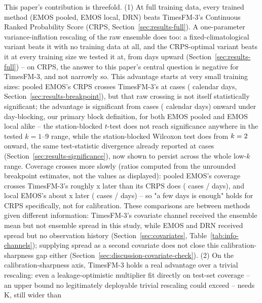This paper's contribution is threefold. (1) At full training data, every
trained method (EMOS pooled, EMOS local, DRN) beats TimesFM-3's
Continuous Ranked Probability Score (CRPS, Section~\ref{sec:results-full}).
A one-parameter variance-inflation
rescaling of the raw ensemble does too: a fixed-climatological variant
beats it with no training data at all, and the CRPS-optimal variant beats
it at every training size we tested it at, from \InflASmallestNDays{}
days upward (Section~\ref{sec:results-full}) -- on CRPS, the answer to
this paper's central question is negative for TimesFM-3, and not
narrowly so. This advantage starts at very small training sizes: pooled
EMOS's CRPS crosses TimesFM-3's at \BpCrpsPooledCases{} cases
(\BpCrpsPooledDays{} calendar days, Section~\ref{sec:results-breakpoint}),
but that raw crossing is not itself statistically significant; the
advantage is significant from \BpCrpsPooledSigK{} cases
(\BpCrpsPooledSigDays{} calendar days) onward under day-blocking, our
primary block definition, for both EMOS pooled and EMOS local alike --
the station-blocked \(t\)-test does not reach significance anywhere in
the tested \(k=1\)--9 range, while the station-blocked Wilcoxon test does
from \(k=2{}\) onward, the same
test-statistic divergence already reported at \SigTestNCases{} cases
(Section~\ref{sec:results-significance}), now shown to persist across the
whole low-\(k\) range. Coverage crosses more slowly
(ratios computed from the unrounded breakpoint estimates, not the
values as displayed): pooled EMOS's coverage crosses TimesFM-3's roughly
\CoverageCrpsRatioPooled{}x later than its CRPS does (\BpCoveragePooledCases{}
cases / \BpCoveragePooledDays{} days), and local EMOS's about
\CoverageCrpsRatioLocal{}x later (\BpCoverageLocalCases{} cases /
\BpCoverageLocalDays{} days) -- so "a few days is enough" holds for CRPS
specifically, not for calibration. These comparisons are between methods
given different information: TimesFM-3's covariate channel received the
ensemble mean but not ensemble spread in this study, while EMOS and DRN
received spread but no observation history (Section~\ref{sec:covariates},
Table~\ref{tab:info-channels}); supplying spread as a second covariate
does not close this calibration-sharpness gap either
(Section~\ref{sec:discussion-covariate-check}). (2) On the
calibration-sharpness axis, TimesFM-3 holds a real advantage over a
trivial rescaling: even a leakage-optimistic multiplier fit directly on
test-set coverage -- an upper bound no legitimately deployable trivial
rescaling could exceed -- needs \InflLeakyWidth{} K, still wider than
